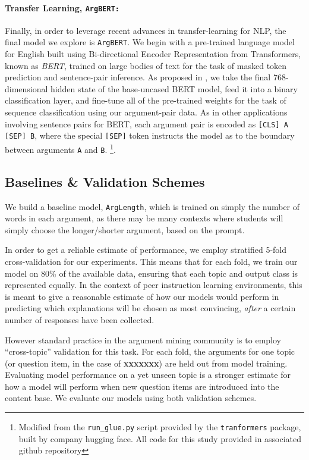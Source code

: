 \documentclass[runningheads]{llncs}
\begin{document}
\paragraph{\textbf{Transfer Learning, \tt{ArgBERT}:}}
Finally, in order to leverage recent advances in transfer-learning for NLP, the 
final model we explore is \verb|ArgBERT|.
We begin with a pre-trained language model for English built using  
Bi-directional Encoder Representation from Transformers, known as 
\textit{BERT}\cite{devlin_bert_2018}, trained on large bodies of text for the 
task of masked token prediction and sentence-pair inference. 
As proposed in \cite{toledo_automatic_2019}, we take the final 768-dimensional 
hidden state of the base-uncased BERT model, feed it into a binary 
classification layer, and fine-tune all of the pre-trained weights for the task 
of sequence classification using our argument-pair data. 
As in other applications involving sentence pairs for BERT, each argument pair 
is encoded as \verb|[CLS] A [SEP] B|, where the special \verb|[SEP]| token 
instructs the model as to the boundary between arguments \verb|A| and \verb|B|. 
\footnote{Modified from the \verb|run_glue.py| 
script provided by the \verb|tranformers| package, built by company hugging 
face. All code for this study provided in associated github repository}.

\subsection{Baselines \& Validation Schemes}

We build a baseline model, \verb|ArgLength|, which is trained 
on simply the number of words in each argument, as there may be many contexts 
where students will simply choose the longer/shorter argument, based on the 
prompt. 

In order to get a reliable estimate of performance, we employ stratified 5-fold 
cross-validation for our experiments.
This means that for each fold, we train our model on 80\% of the available 
data, ensuring that each topic and output class is represented equally. 
In the context of peer instruction learning environments, this is meant to give 
a reasonable estimate of how our models would perform in predicting which 
explanations will be chosen as most convincing, \textit{after} a certain number 
of responses have been collected.
 
However standard practice in the argument mining community is to employ 
``cross-topic'' validation for this task. 
For each fold, the arguments for one topic (or question item, in the case of 
\textbf{xxxxxxx}) are held out from model training.
Evaluating model performance on a yet unseen topic is a stronger estimate for 
how a model will perform when new question items are introduced into the 
content base.
We evaluate our models using both validation schemes.
\end{document}
